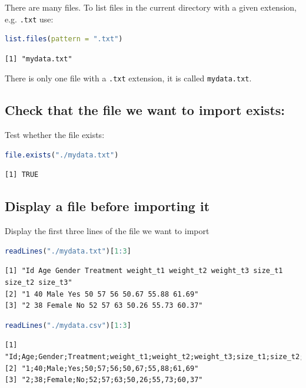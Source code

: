 \documentclass{article}
\begin{document}
There are many files. To list files in the current directory with a
given extension, e.g. \texttt{.txt} use:
\begin{lstlisting}[language=r,numbers=none]
list.files(pattern = ".txt") 
\end{lstlisting}

\label{}
\begin{verbatim}
[1] "mydata.txt"
\end{verbatim}


There is only one file with a \texttt{.txt} extension, it is called
\texttt{mydata.txt}.
\subsection{Check that the file we want to import exists:}
\label{sec:orgc291b48}

Test whether the file exists:
\begin{lstlisting}[language=r,numbers=none]
file.exists("./mydata.txt")
\end{lstlisting}

\label{}
\begin{verbatim}
[1] TRUE
\end{verbatim}
\subsection{Display a file before importing it}
\label{sec:org4b783ac}


Display the first three lines of the file we want to import
\begin{lstlisting}[language=r,numbers=none]
readLines("./mydata.txt")[1:3]
\end{lstlisting}

\label{}
\begin{verbatim}
[1] "Id Age Gender Treatment weight_t1 weight_t2 weight_t3 size_t1 size_t2 size_t3"
[2] "1 40 Male Yes 50 57 56 50.67 55.88 61.69"                                     
[3] "2 38 Female No 52 57 63 50.26 55.73 60.37"
\end{verbatim}


\begin{lstlisting}[language=r,numbers=none]
readLines("./mydata.csv")[1:3]
\end{lstlisting}

\label{}
\begin{verbatim}
[1] "Id;Age;Gender;Treatment;weight_t1;weight_t2;weight_t3;size_t1;size_t2;size_t3"
[2] "1;40;Male;Yes;50;57;56;50,67;55,88;61,69"                                     
[3] "2;38;Female;No;52;57;63;50,26;55,73;60,37"
\end{verbatim}
\end{document}
